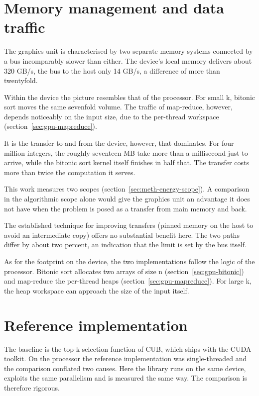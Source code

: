 

\section{Memory management and data traffic}
\label{sec:gpu-memory}

The graphics unit is characterised by two separate memory systems connected by
a bus incomparably slower than either. The device's local memory delivers about
320 GB/s, the bus to the host only 14 GB/s, a difference of more than
twentyfold.

Within the device the picture resembles that of the processor. For small k,
bitonic sort moves the same sevenfold volume. The traffic of map-reduce,
however, depends noticeably on the input size, due to the per-thread workspace
(section~\ref{sec:gpu-mapreduce}).

It is the transfer to and from the device, however, that dominates. For four
million integers, the roughly seventeen MB take more than a millisecond just to
arrive, while the bitonic sort kernel itself finishes in half that. The
transfer costs more than twice the computation it serves.

This work measures two scopes (section~\ref{sec:meth-energy-scope}). A
comparison in the algorithmic scope alone would give the graphics unit an
advantage it does not have when the problem is posed as a transfer from main
memory and back.

The established technique for improving transfers (pinned memory on the host to
avoid an intermediate copy) offers no substantial benefit here. The two paths
differ by about two percent, an indication that the limit is set by the bus
itself.

As for the footprint on the device, the two implementations follow the logic of
the processor. Bitonic sort allocates two arrays of size n
(section~\ref{sec:gpu-bitonic}) and map-reduce the per-thread heaps
(section~\ref{sec:gpu-mapreduce}). For large k, the heap workspace can approach
the size of the input itself.

\section{Reference implementation}
\label{sec:gpu-reference}

The baseline is the top-k selection function of CUB, which ships with the CUDA
toolkit. On the processor the reference implementation was single-threaded and
the comparison conflated two causes. Here the library runs on the same device,
exploits the same parallelism and is measured the same way. The comparison is
therefore rigorous.

